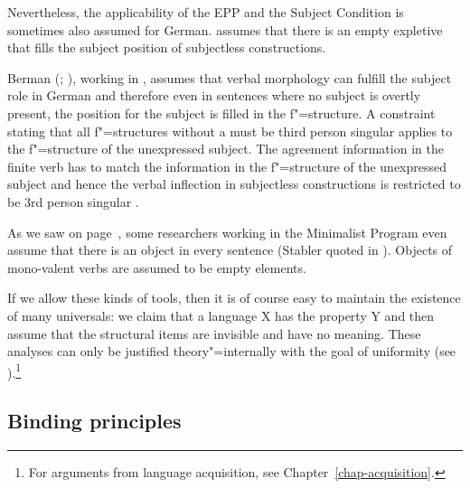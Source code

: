 \noindent
Nevertheless, the applicability of the EPP and the Subject Condition is sometimes also assumed for German.
\citet[]{Grewendorf93}
assumes that there is an empty expletive that fills the subject position of subjectless constructions.

Berman (\citeyear[]{Berman99a};
\citeyear[Chapter~4]{Berman2003a}), working in \lfg, assumes that verbal morphology can fulfill the subject role
in German and therefore even in sentences where no subject is overtly present, the position for the subject is filled
in the f"=structure. A constraint stating that all f"=structures without a \predv must be third
person singular applies to the f"=structure of the unexpressed subject. The agreement information in
the finite verb has to match the information in the f"=structure of the unexpressed subject and
hence the verbal inflection in subjectless constructions is restricted to be 3rd person singular \citep{Berman99a}. 

As we saw on page~\pageref{Seite-leeres-Objekt}, some researchers working in the Minimalist Program even
assume that there is an object in every sentence (Stabler quoted in
\citet[, 124]{Veenstra98a}). Objects of mono-valent verbs are assumed to be empty
elements.
 
If we allow these kinds of tools, then it is of course easy to maintain the existence of many universals: we claim that a language X has the property Y and then assume that
the structural items are invisible and have no meaning. These analyses can only be justified theory"=internally with the goal of uniformity
(see \citealp[Section~2.1.2]{CJ2005a}).\footnote{
	For arguments from language acquisition, see Chapter~\ref{chap-acquisition}.
	}

\subsection{Binding principles}

